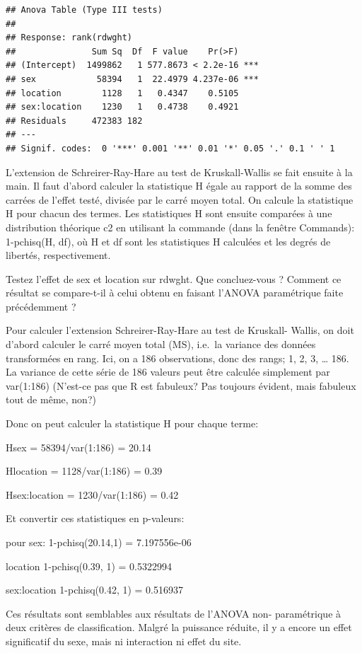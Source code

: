 \documentclass[12pt,]{book}
\begin{document}
\begin{verbatim}
## Anova Table (Type III tests)
## 
## Response: rank(rdwght)
##               Sum Sq  Df  F value    Pr(>F)    
## (Intercept)  1499862   1 577.8673 < 2.2e-16 ***
## sex            58394   1  22.4979 4.237e-06 ***
## location        1128   1   0.4347    0.5105    
## sex:location    1230   1   0.4738    0.4921    
## Residuals     472383 182                       
## ---
## Signif. codes:  0 '***' 0.001 '**' 0.01 '*' 0.05 '.' 0.1 ' ' 1
\end{verbatim}

L'extension de Schreirer-Ray-Hare au test de Kruskall-Wallis se fait ensuite à la main. Il faut d'abord calculer la statistique H égale au rapport de la somme des carrées de l'effet testé, divisée par le carré moyen total. On calcule la statistique H pour chacun des termes. Les statistiques H sont ensuite comparées à une distribution théorique c2 en utilisant la commande (dans la fenêtre Commands): 1-pchisq(H, df), où H et df sont les statistiques H calculées et les degrés de libertés, respectivement.

Testez l'effet de sex et location sur rdwght. Que concluez-vous ? Comment ce résultat se compare-t-il à celui obtenu en faisant l'ANOVA paramétrique faite précédemment ?

Pour calculer l'extension Schreirer-Ray-Hare au test de Kruskall- Wallis, on doit d'abord calculer le carré moyen total (MS), i.e.~la variance des données transformées en rang. Ici, on a 186 observations, donc des rangs; 1, 2, 3, \ldots{} 186. La variance de cette série de 186 valeurs peut être calculée simplement par var(1:186) (N'est-ce pas que R est fabuleux? Pas toujours évident, mais fabuleux tout de même, non?)

Donc on peut calculer la statistique H pour chaque terme:

Hsex = 58394/var(1:186) = 20.14

Hlocation = 1128/var(1:186) = 0.39

Hsex:location = 1230/var(1:186) = 0.42

Et convertir ces statistiques en p-valeurs:

pour sex: 1-pchisq(20.14,1) = 7.197556e-06

location 1-pchisq(0.39, 1) = 0.5322994

sex:location 1-pchisq(0.42, 1) = 0.516937

Ces résultats sont semblables aux résultats de l'ANOVA non- paramétrique à deux critères de classification. Malgré la puissance réduite, il y a encore un effet significatif du sexe, mais ni interaction ni effet du site.
\end{document}

